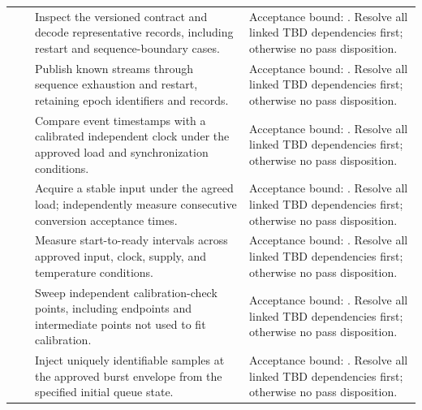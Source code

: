 \begin{landscape}
\begin{tabularx}{\linewidth}{L{2cm}L{3cm}Y Y}
 & \par {} & Inspect the versioned contract and decode representative records, including restart and sequence-boundary cases. & Acceptance bound: . Resolve all linked TBD dependencies first; otherwise no pass disposition.\\
 & \par {} & Publish known streams through sequence exhaustion and restart, retaining epoch identifiers and records. & Acceptance bound: . Resolve all linked TBD dependencies first; otherwise no pass disposition.\\
 & \par {} & Compare event timestamps with a calibrated independent clock under the approved load and synchronization conditions. & Acceptance bound: . Resolve all linked TBD dependencies first; otherwise no pass disposition.\\
 & \par {} & Acquire a stable input under the agreed load; independently measure consecutive conversion acceptance times. & Acceptance bound: . Resolve all linked TBD dependencies first; otherwise no pass disposition.\\
 & \par {} & Measure start-to-ready intervals across approved input, clock, supply, and temperature conditions. & Acceptance bound: . Resolve all linked TBD dependencies first; otherwise no pass disposition.\\
 & \par {} & Sweep independent calibration-check points, including endpoints and intermediate points not used to fit calibration. & Acceptance bound: . Resolve all linked TBD dependencies first; otherwise no pass disposition.\\
 & \par {} & Inject uniquely identifiable samples at the approved burst envelope from the specified initial queue state. & Acceptance bound: . Resolve all linked TBD dependencies first; otherwise no pass disposition.\\

\end{tabularx}
\end{landscape}
